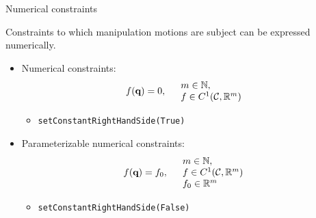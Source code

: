 
%
%
\begin {frame} {Numerical constraints}

Constraints to which manipulation motions are subject can be expressed numerically.
\begin{itemize}
\item Numerical constraints:
  $$f (\textbf{q}) = 0,\ \ \ \begin{array}{l}m\in\mathbb{N},\\ f\in C^1({\cal C},\mathbb{R}^m)\end{array} $$
  \begin{itemize}
    \item \texttt{\scriptsize setConstantRightHandSide(True)}
  \end{itemize}
\item Parameterizable numerical constraints:
  $$f (\conf) = f_0,\ \ \ \begin{array}{l}m\in\entiernaturel,\\ f\in C^1(\CS,\real^m) \\ f_0\in\real^m\end{array} $$
  \begin{itemize}
    \item \texttt{\scriptsize setConstantRightHandSide(False)}
  \end{itemize}
\end{itemize}

\end{frame}

%
%


